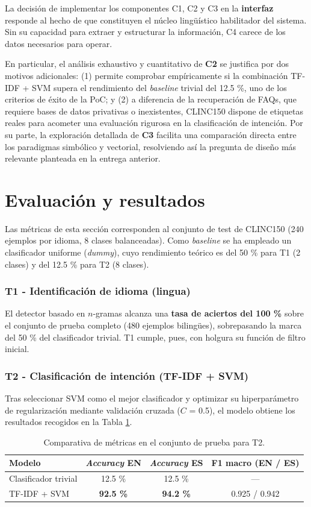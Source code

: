 \documentclass[11pt,a4paper,twoside]{article}
\theoremstyle{definition}
\numberwithin{equation}{section}
\begin{document}
La decisión de implementar los componentes C1, C2 y C3 en la \textbf{interfaz} responde al hecho de que constituyen el núcleo lingüístico habilitador del sistema. Sin su capacidad para extraer y estructurar la información, C4 carece de los datos necesarios para operar. 

En particular, el análisis exhaustivo y cuantitativo de \textbf{C2} se justifica por dos motivos adicionales: (1) permite comprobar empíricamente si la combinación TF-IDF + SVM supera el rendimiento del \textit{baseline} trivial del 12.5 \%, uno de los criterios de éxito de la PoC; y (2) a diferencia de la recuperación de FAQs, que requiere bases de datos privativas o inexistentes, CLINC150 dispone de etiquetas reales para acometer una evaluación rigurosa en la clasificación de intención. Por su parte, la exploración detallada de \textbf{C3} facilita una comparación directa entre los paradigmas simbólico y vectorial, resolviendo así la pregunta de diseño más relevante planteada en la entrega anterior.


\section{Evaluación y resultados}
Las métricas de esta sección corresponden al conjunto de test de CLINC150 (240 ejemplos por idioma, 8 clases balanceadas). Como \textit{baseline} se ha empleado un clasificador uniforme (\textit{dummy}), cuyo rendimiento teórico es del 50 \% para T1 (2 clases) y del 12.5 \% para T2 (8 clases).

\subsubsection*{T1 - Identificación de idioma (lingua)}
El detector basado en $n$-gramas alcanza una \textbf{tasa de aciertos del 100 \%} sobre el conjunto de prueba completo (480 ejemplos bilingües), sobrepasando la marca del 50 \% del clasificador trivial. T1 cumple, pues, con holgura su función de filtro inicial.

\subsubsection*{T2 - Clasificación de intención (TF-IDF + SVM)}
Tras seleccionar SVM como el mejor clasificador y optimizar su hiperparámetro de regularización mediante validación cruzada ($C$ = 0.5), el modelo obtiene los resultados recogidos en la Tabla \ref{tab:T2}.

\vspace{5pt}
\begin{table}[H]
	\centering
	\begin{tabular}{lccc}
		\toprule
		\textbf{Modelo} & \textbf{\textit{Accuracy} EN} & \textbf{\textit{Accuracy} ES} & \textbf{F1 macro (EN / ES)} \\
		\midrule
		Clasificador trivial & 12.5 \% & 12.5 \% & --- \\
		TF-IDF + SVM  & \textbf{92.5 \%} & \textbf{94.2 \%} & 0.925 / 0.942 \\
		\bottomrule
	\end{tabular}
	\caption{Comparativa de métricas en el conjunto de prueba para T2.}
	\label{tab:T2}
\end{table}
\end{document}
